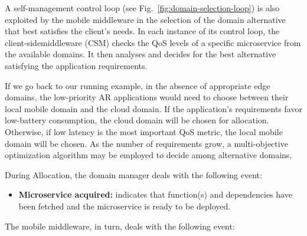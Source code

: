 A self-management control loop (see Fig.~\ref{fig:domain-selection-loop}) is also exploited by the mobile middleware in the selection of the domain alternative that best satisfies the client's needs. In each instance of its control loop, the client-sidemiddleware (CSM) checks the QoS levels of a specific microservice from the available domains. It then analyses and decides for the best alternative satisfying the application requirements.




If we go back to our running example, in the absence of appropriate edge domains, the low-priority AR applications would need to choose between their local mobile domain and the cloud domain. If the application's requirements favor low-battery consumption, the cloud domain will be chosen for allocation. Otherwise, if low latency is the most important QoS metric, the local mobile domain will be chosen. As the number of requirements grow, a multi-objective optimization algorithm may be employed to decide among alternative domains.

During Allocation, the domain manager deals with the following event:

\begin{itemize}
	
\item \textbf{Microservice acquired:} indicates that function(s) and dependencies have been fetched and the microservice is ready to be deployed.

\end{itemize}

The mobile middleware, in turn, deals with the following event:

